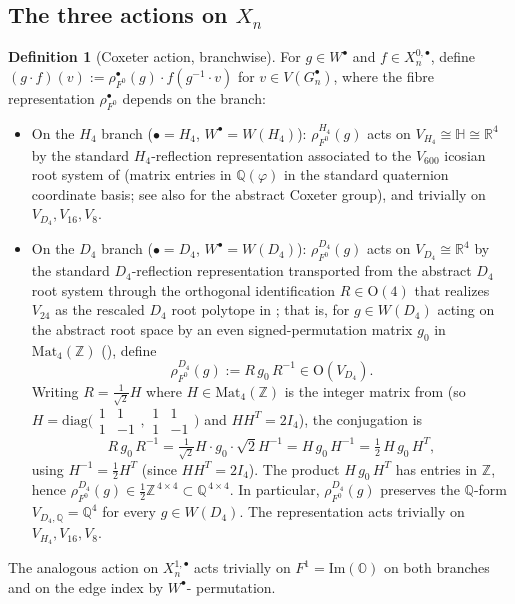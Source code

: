 \documentclass[11pt, a4paper]{amsart}
\theoremstyle{definition}
\newtheorem{definition}[theorem]{Definition}
\newcommand{\R}{\mathbb{R}}
\newcommand{\Q}{\mathbb{Q}}
\newcommand{\Z}{\mathbb{Z}}
\newcommand{\HH}{\mathbb{H}}
\newcommand{\OO}{\mathbb{O}}
\renewcommand{\Im}{\mathrm{Im}}
\begin{document}
\subsection{The three actions on $X_n$}

\begin{definition}[Coxeter action, branchwise]
\label{def:coxeter}
For $g \in W^\bullet$ and $f \in X_n^{0, \bullet}$, define
$(g \cdot f)(v) := \rho_{F^0}^\bullet(g) \cdot f(g^{-1} \cdot v)$
for $v \in V(G_n^\bullet)$, where the fibre representation
$\rho_{F^0}^\bullet$ depends on the branch:
\begin{itemize}
\item On the $H_4$ branch ($\bullet = H_4$, $W^\bullet = W(H_4)$):
  $\rho_{F^0}^{H_4}(g)$ acts on $V_{H_4} \cong \HH \cong \R^4$ by
  the standard $H_4$-reflection representation associated to the
  $V_{600}$ icosian root system of
  \cite[Definitions~\texttt{def:icosian-ring},
  \texttt{def:V600}]{AlgebraicSubstrate} (matrix entries in
  $\Q(\varphi)$ in the standard quaternion coordinate basis;
  see also \cite[Ch.~2]{Humphreys} for the abstract Coxeter
  group), and trivially on $V_{D_4}, V_{16}, V_8$.
\item On the $D_4$ branch ($\bullet = D_4$, $W^\bullet = W(D_4)$):
  $\rho_{F^0}^{D_4}(g)$ acts on $V_{D_4} \cong \R^4$ by the
  standard $D_4$-reflection representation transported from the
  abstract $D_4$ root system through the orthogonal identification
  $R \in \mathrm{O}(4)$ that realizes $V_{24}$ as the rescaled
  $D_4$ root polytope in
  \cite[Definition~\texttt{def:V24} and
  Proposition~\texttt{prop:24-in-600}]{AlgebraicSubstrate}; that is,
  for $g \in W(D_4)$ acting on the abstract root space by an
  even signed-permutation matrix $g_0$ in
  $\mathrm{Mat}_4(\Z)$ (\cite[Ch.~2]{Humphreys}), define
  \[
    \rho_{F^0}^{D_4}(g) := R \, g_0 \, R^{-1} \in \mathrm{O}(V_{D_4}).
  \]
  Writing $R = \tfrac{1}{\sqrt{2}} H$ where $H \in \mathrm{Mat}_4(\Z)$
  is the integer matrix from
  \cite[Proposition~\texttt{prop:24-in-600}]{AlgebraicSubstrate}
  (so $H = \mathrm{diag}\bigl(\begin{smallmatrix} 1 & 1\\ 1 & -1
  \end{smallmatrix}, \begin{smallmatrix} 1 & 1\\ 1 & -1
  \end{smallmatrix}\bigr)$ and $H H^T = 2 I_4$), the conjugation
  is
  \[
    R \, g_0 \, R^{-1}
    = \tfrac{1}{\sqrt{2}} H \cdot g_0 \cdot \sqrt{2} H^{-1}
    = H \, g_0 \, H^{-1}
    = \tfrac{1}{2}\, H \, g_0 \, H^T,
  \]
  using $H^{-1} = \tfrac{1}{2} H^T$ (since $H H^T = 2 I_4$). The
  product $H \, g_0 \, H^T$ has entries in $\Z$, hence
  $\rho_{F^0}^{D_4}(g) \in \tfrac{1}{2}\Z^{\,4 \times 4} \subset
  \Q^{\,4 \times 4}$. In particular,
  $\rho_{F^0}^{D_4}(g)$ preserves the $\Q$-form
  $V_{D_4, \Q} = \Q^4$ for every $g \in W(D_4)$. The
  representation acts trivially on $V_{H_4}, V_{16}, V_8$.
\end{itemize}
The analogous action on $X_n^{1, \bullet}$ acts trivially on $F^1
= \Im(\OO)$ on both branches and on the edge index by $W^\bullet$-
permutation.
\end{definition}
\end{document}
